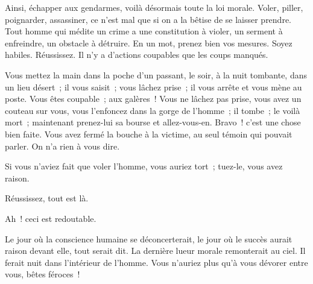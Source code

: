 \documentclass[french,twoside]{book} %
\begin{document}
Ainsi, échapper aux gendarmes, voilà désormais toute la loi morale. Voler, piller, poignarder, assassiner, ce n’est mal que si on a la bêtise de se laisser prendre. Tout homme qui médite un crime a une constitution à violer, un serment à enfreindre, un obstacle à détruire. En un mot, prenez bien vos mesures. Soyez habiles. Réussissez. Il n’y a d’actions coupables que les coups manqués.\par
Vous mettez la main dans la poche d’un passant, le soir, à la nuit tombante, dans un lieu désert ; il vous saisit ; vous lâchez prise ; il vous arrête et vous mène au poste. Vous êtes coupable ; aux galères ! Vous ne lâchez pas prise, vous avez un couteau sur vous, vous l’enfoncez dans la gorge de l’homme ; il tombe ; le voilà mort ; maintenant prenez-lui sa bourse et allez-vous-en. Bravo ! c’est une chose bien faite. Vous avez fermé la bouche à la victime, au seul témoin qui pouvait parler. On n’a rien à vous dire.\par
Si vous n’aviez fait que voler l’homme, vous auriez tort ; tuez-le, vous avez raison.\par
Réussissez, tout est là.\par
Ah ! ceci est redoutable.\par
Le jour où la conscience humaine se déconcerterait, le jour où le succès aurait raison devant elle, tout serait dit. La dernière lueur morale remonterait au ciel. Il ferait nuit dans l’intérieur de l’homme. Vous n’auriez plus qu’à vous dévorer entre vous, bêtes féroces !\par
\end{document}
